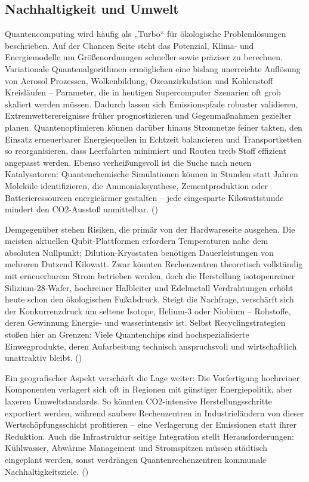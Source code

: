 \subsection{Nachhaltigkeit und Umwelt}
Quantencomputing wird häufig als „Turbo“ für ökologische Problemlösungen beschrieben. Auf der Chancen Seite steht das Potenzial, Klima- und Energiemodelle um Größenordnungen schneller sowie präziser zu berechnen. Variationale Quantenalgorithmen ermöglichen eine bislang unerreichte Auflösung von Aerosol Prozessen, Wolkenbildung, Ozeanzirkulation und Kohlenstoff Kreisläufen – Parameter, die in heutigen Supercomputer Szenarien oft grob skaliert werden müssen. Dadurch lassen sich Emissionspfade robuster validieren, Extremwetterereignisse früher prognostizieren und Gegenmaßnahmen gezielter planen. Quantenoptimieren können darüber hinaus Stromnetze feiner takten, den Einsatz erneuerbarer Energiequellen in Echtzeit balancieren und Transportketten so reorganisieren, dass Leerfahrten minimiert und Routen treib Stoff effizient angepasst werden. Ebenso verheißungsvoll ist die Suche nach neuen Katalysatoren: Quantenchemische Simulationen können in Stunden statt Jahren Moleküle identifizieren, die Ammoniaksynthese, Zementproduktion oder Batterieressourcen energieärmer gestalten – jede eingesparte Kilowattstunde mindert den CO2-Ausstoß unmittelbar. (\cite{schwabeOpportunitiesChallengesQuantum2025a})

Demgegenüber stehen Risiken, die primär von der Hardwareseite ausgehen. Die meisten aktuellen Qubit-Plattformen erfordern Temperaturen nahe dem absoluten Nullpunkt; Dilution-Kryostaten benötigen Dauerleistungen von mehreren Dutzend Kilowatt. Zwar könnten Rechenzentren theoretisch vollständig mit erneuerbarem Strom betrieben werden, doch die Herstellung isotopenreiner Silizium-28-Wafer, hochreiner Halbleiter und Edelmetall Verdrahtungen erhöht heute schon den ökologischen Fußabdruck. Steigt die Nachfrage, verschärft sich der Konkurrenzdruck um seltene Isotope, Helium-3 oder Niobium – Rohstoffe, deren Gewinnung Energie- und wasserintensiv ist. Selbst Recyclingstrategien stoßen hier an Grenzen: Viele Quantenchips sind hochspezialisierte Einwegprodukte, deren Aufarbeitung technisch anspruchsvoll und wirtschaftlich unattraktiv bleibt. (\cite{rootQuantumTechnologiesContext2025})

Ein geografischer Aspekt verschärft die Lage weiter: Die Vorfertigung hochreiner Komponenten verlagert sich oft in Regionen mit günstiger Energiepolitik, aber laxeren Umweltstandards. So könnten CO2-intensive Herstellungsschritte exportiert werden, während saubere Rechenzentren in Industrieländern von dieser Wertschöpfungsschicht profitieren – eine Verlagerung der Emissionen statt ihrer Reduktion. Auch die Infrastruktur seitige Integration stellt Herausforderungen: Kühlwasser, Abwärme Management und Stromspitzen müssen städtisch eingeplant werden, sonst verdrängen Quantenrechenzentren kommunale Nachhaltigkeitsziele. (\cite{rootQuantumTechnologiesContext2025})

